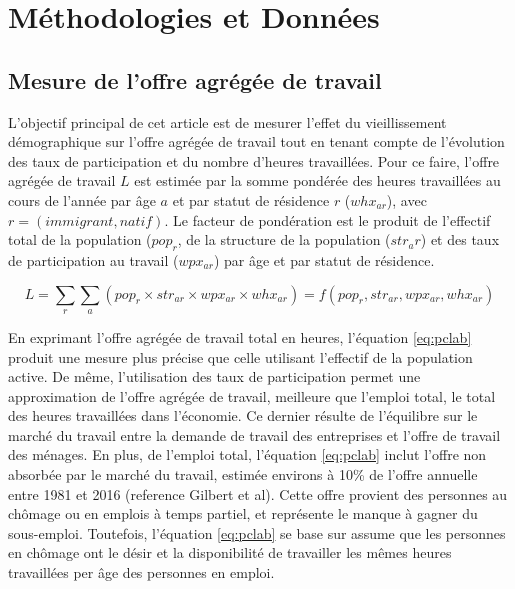 \section{Méthodologies et Données}\label{sec:lab_method}

\subsection{Mesure de l'offre agrégée de travail}
L’objectif principal de cet article est de mesurer l’effet du vieillissement démographique sur l’offre agrégée de travail tout en tenant compte de l'évolution des taux de participation et du nombre d’heures travaillées.
Pour ce faire, l'offre agrégée de travail \(L \) est estimée par la somme pondérée des heures travaillées au cours de l'année par âge \(a \) et par statut de résidence \(r \) (\(whx_{ar} \)), avec \(r = (immigrant, natif)\).
Le facteur de pondération est le produit de l'effectif total de la population (\(pop_{r}\), de la structure de la population (\(str_ar \)) et des taux de participation au travail (\(wpx_{ar}\)) par âge et par statut de résidence.

\begin{equation}\label{eq:pclab}
  L= \displaystyle\sum_{r}\displaystyle\sum_{a}(pop_{r} \times str_{ar} \times wpx_{ar} \times whx_{ar} )=f(pop_{r}, str_{ar}, wpx_{ar}, whx_{ar})
\end{equation}

En exprimant l'offre agrégée de travail total en heures, l’équation \eqref{eq:pclab} produit une mesure plus précise que celle utilisant l'effectif de la population active.
De même, l'utilisation des taux de participation permet une approximation de l'offre agrégée de travail, meilleure que l'emploi total, le total des heures travaillées dans l’économie. 
Ce dernier résulte de l’équilibre sur le marché du travail entre la demande de travail des entreprises et l’offre de travail des ménages. 
En plus, de l'emploi total, l’équation \eqref{eq:pclab} inclut l'offre non absorbée par le marché du travail, estimée environs à 10\% de l'offre annuelle entre 1981 et 2016 (reference Gilbert et al).
Cette offre provient des personnes au chômage ou en emplois à temps partiel, et représente le manque à gagner du sous-emploi.
Toutefois, l’équation \eqref{eq:pclab} se base sur assume que les personnes en chômage ont le désir et la disponibilité de travailler les mêmes heures travaillées per âge des personnes en emploi.

